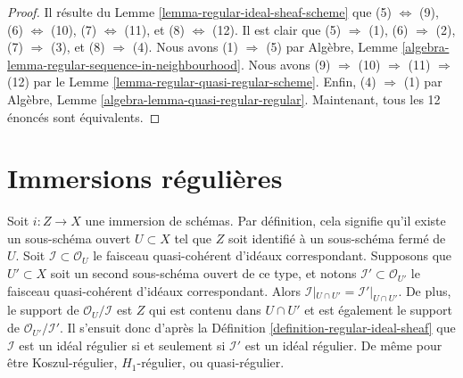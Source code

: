 \begin{proof}
Il résulte du Lemme  \ref{lemma-regular-ideal-sheaf-scheme}  que (5)  $\Leftrightarrow$  (9), (6)  $\Leftrightarrow$  (10),
(7)  $\Leftrightarrow$  (11), et (8)  $\Leftrightarrow$  (12). Il est clair que (5)  $\Rightarrow$ 
(1), (6)  $\Rightarrow$  (2), (7)  $\Rightarrow$  (3), et (8)  $\Rightarrow$  (4). Nous
avons (1)  $\Rightarrow$  (5) par Algèbre, Lemme  \ref{algebra-lemma-regular-sequence-in-neighbourhood}. Nous avons (9)
 $\Rightarrow$  (10)  $\Rightarrow$  (11)  $\Rightarrow$  (12) par le Lemme  \ref{lemma-regular-quasi-regular-scheme}.
Enfin, (4)  $\Rightarrow$  (1) par Algèbre, Lemme  \ref{algebra-lemma-quasi-regular-regular}. Maintenant, tous les
12 énoncés sont équivalents.
\end{proof}













\section{Immersions régulières}
\label{section-regular-immersions}

\noindent
Soit  $i : Z \to X$  une immersion de schémas. Par définition, cela signifie qu'il
existe un sous-schéma ouvert  $U \subset X$  tel que  $Z$  soit identifié à un
sous-schéma fermé de  $U$. Soit  $\mathcal{I} \subset \mathcal{O}_U$  le faisceau quasi-cohérent
d'idéaux correspondant. Supposons que  $U' \subset X$  soit un second sous-schéma
ouvert de ce type, et notons  $\mathcal{I}' \subset \mathcal{O}_{U'}$  le faisceau quasi-cohérent d'idéaux
correspondant. Alors  $\mathcal{I}|_{U \cap U'} = \mathcal{I}'|_{U \cap U'}$. De plus, le support de  $\mathcal{O}_U/\mathcal{I}$  est
 $Z$  qui est contenu dans  $U \cap U'$  et est également le support de
 $\mathcal{O}_{U'}/\mathcal{I}'$. Il s'ensuit donc d'après la Définition  \ref{definition-regular-ideal-sheaf}  que  $\mathcal{I}$ 
est un idéal régulier si et seulement si  $\mathcal{I}'$  est un idéal régulier. De
même pour être Koszul-régulier,  $H_1$-régulier, ou quasi-régulier.

